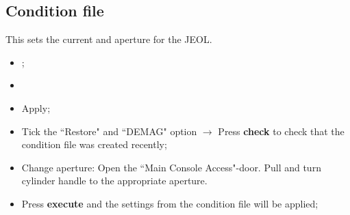 
\subsection{Condition file}
\begin{framed}\noindent
  This sets the current and aperture for the JEOL.
\end{framed}
\begin{itemize}
\item  {};
\item {}
\item Apply; %
\item Tick the ``Restore" and ``DEMAG" option $\rightarrow$ Press \textbf{check}
  to check that the condition file was created recently;
\item  Change aperture:  Open the  ``Main Console  Access"-door.  Pull  and turn
  cylinder handle  to the appropriate  aperture.  
\item Press  \textbf{execute} and the settings  from the condition file  will be
  applied;
\end{itemize}

